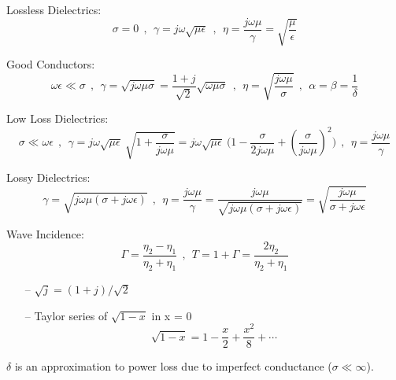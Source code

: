 Lossless Dielectrics:
$$ \sigma = 0 ~~ , ~~ \gamma = j \omega \sqrt{\mu \epsilon} ~~ , ~~ \eta = \frac{j \omega \mu}{\gamma} = \sqrt{\frac{\mu}{\epsilon}} $$
\par
Good Conductors:
$$ \omega \epsilon \ll \sigma ~~ , ~~ \gamma = \sqrt{j \omega \mu \sigma } =\frac{1+j}{\sqrt{2}} \sqrt{\omega \mu \sigma}~~ , ~~ \eta = \sqrt{\frac{j \omega \mu}{\sigma}} ~~ , ~~ \alpha = \beta = \frac{1}{\delta}$$
\par
Low Loss Dielectrics: 
$$ \sigma \ll \omega \epsilon ~~ , ~~ \gamma = j \omega \sqrt{\mu \epsilon}~\sqrt{1+\frac{\sigma}{j \omega \mu}} = j \omega \sqrt{\mu \epsilon}~\Big(1 - \frac{\sigma}{2 j \omega \mu} + (\frac{\sigma}{j \omega \mu})^2\Big)~~ , ~~ \eta = \frac{j \omega \mu}{\gamma} $$
\par
Lossy Dielectrics: 
$$  \gamma = \sqrt{j \omega \mu (\sigma + j \omega \epsilon)}~~ , ~~ \eta = \frac{j \omega \mu}{\gamma} = \frac{j \omega \mu}{\sqrt{j \omega \mu (\sigma + j \omega \epsilon)}} = \sqrt{\frac{j \omega \mu}{\sigma + j \omega \epsilon}} $$
\par
Wave Incidence: 
$$  \Gamma = \frac{{\eta}_2 - {\eta}_1}{{\eta}_2 +{\eta}_1} ~~ , ~~ T = 1 + \Gamma = \frac{2 {\eta}_2}{{\eta}_2 + {\eta}_1}$$
\setlength{\parindent}{0.0cm} %
\par
\begin{itemize}
\item[--] $\sqrt{j} = (1+j)/\sqrt{2}$
\item[--] Taylor series of $\sqrt{1-x}$ in x = 0
$$ \sqrt{1-x} = 1 - \frac{x}{2} + \frac{x^2}{8} + \cdots $$
\end{itemize}
\par
$\delta$ is an approximation to power loss due to imperfect conductance ($\sigma\ll\infty$).
\par
\begin{minipage}[b]{.49\textwidth}
\lipsum[1-2]
\end{minipage}%
\hspace{.02\textwidth}
\begin{minipage}[b]{.49\textwidth}
\lipsum[1-2]
\end{minipage}%

